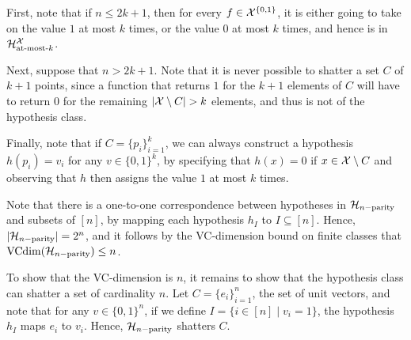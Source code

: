 \begin{ex}
\begin{enumerate}
          First, note that if $n\leq 2k+1$, then for every $f\in \mathcal{X}^{\{0, 1\}}$, it is
          either going to take on the value $1$ at most $k$ times, or the value $0$ at most
          $k$ times, and hence is in $\mathcal{H}^{\mathcal{X}}_{\text{at-most-$k$}}$.

          Next, suppose that $n>2k+1$. Note that it is never possible to shatter a set $C$ of
          $k+1$ points, since a function that returns $1$ for the $k+1$ elements of $C$ will have
          to return $0$ for the remaining $|\X\setminus C|>k$ elements, and thus is not of the
          hypothesis class.

          Finally, note that if $C=\{p_i\}_{i=1}^k$, we can always construct a hypothesis
          $h(p_i)=v_i$ for any $v\in \{0,1\}^k$, by specifying that $h(x)=0$ if $x\in \mathcal{X}\setminus C$
          and observing that $h$ then assigns the value $1$ at most $k$ times.
  \end{enumerate}
\end{ex}

\begin{ex}
  Note that there is a one-to-one correspondence between hypotheses in $\mathcal{H}_{n-\text{parity}}$
  and subsets of $[n]$, by mapping each hypothesis $h_I$ to $I\subseteq [n]$.
  Hence, $|\mathcal{H}_{n-\text{parity}}|=2^n$, and it follows
  by the VC-dimension bound on finite classes that $\operatorname*{VCdim}(\mathcal{H}_{n-\text{parity}})\leq n$.

  To show that the VC-dimension is $n$, it remains to show that the hypothesis class
  can shatter a set of cardinality $n$. Let $C=\{e_i\}_{i=1}^n$,
  the set of unit vectors, and note that for any $v\in \{0, 1\}^n$, if we define
  $I=\{i\in [n]\mid v_i = 1 \}$, the hypothesis $h_I$ maps $e_i$ to $v_i$. Hence,
  $\mathcal{H}_{n-\text{parity}}$ shatters $C$.
\end{ex}

\begin{ex}
\end{ex}

